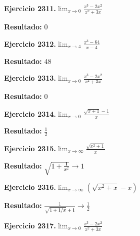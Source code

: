 \documentclass[10pt,a4paper]{article}
\begin{document}
\begin{ejbox}
\textbf{Ejercicio 2311.}\quad $\lim_{x\to 0} \frac{x^3-2x^2}{x^2+3x}$
\end{ejbox}

\begin{solbox}
\textbf{Resultado:} \(\displaystyle 0\)
\end{solbox}

\newpage
\begin{ejbox}
\textbf{Ejercicio 2312.}\quad $\lim_{x\to 4} \frac{x^3-64}{x-4}$
\end{ejbox}

\begin{solbox}
\textbf{Resultado:} \(\displaystyle 48\)
\end{solbox}

\begin{ejbox}
\textbf{Ejercicio 2313.}\quad $\lim_{x\to 0} \frac{x^3-2x^2}{x^2+3x}$
\end{ejbox}

\begin{solbox}
\textbf{Resultado:} \(\displaystyle 0\)
\end{solbox}

\begin{ejbox}
\textbf{Ejercicio 2314.}\quad $\lim_{x\to 0} \frac{\sqrt{x+1}-1}{x}$
\end{ejbox}

\begin{solbox}
\textbf{Resultado:} \(\displaystyle \frac{1}{2}\)
\end{solbox}

\newpage
\begin{ejbox}
\textbf{Ejercicio 2315.}\quad $\lim_{x\to \infty} \frac{\sqrt{x^2+1}}{x}$
\end{ejbox}

\begin{solbox}
\textbf{Resultado:} \(\displaystyle \sqrt{1+\frac{1}{x^2}} \to 1\)
\end{solbox}

\begin{ejbox}
\textbf{Ejercicio 2316.}\quad $\lim_{x\to \infty} (\sqrt{x^2+x} - x)$
\end{ejbox}

\begin{solbox}
\textbf{Resultado:} \(\displaystyle \frac{1}{\sqrt{1+1/x}+1} \to \frac{1}{2}\)
\end{solbox}

\begin{ejbox}
\textbf{Ejercicio 2317.}\quad $\lim_{x\to 0} \frac{x^3-2x^2}{x^2+3x}$
\end{ejbox}
\end{document}
